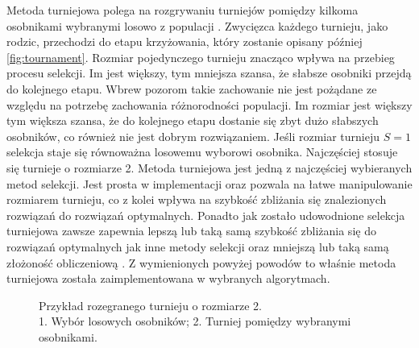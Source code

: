 \documentclass[twoside]{iisthesis}
\begin{document}
Metoda turniejowa polega na rozgrywaniu turniejów pomiędzy kilkoma osobnikami wybranymi losowo z populacji \cite{tournament}. Zwycięzca każdego turnieju, jako rodzic, przechodzi do etapu krzyżowania, który zostanie opisany później \eqref{fig:tournament}. Rozmiar pojedynczego turnieju znacząco wpływa na przebieg procesu selekcji. Im jest większy, tym mniejsza szansa, że słabsze osobniki przejdą do kolejnego etapu. Wbrew pozorom takie zachowanie nie jest pożądane ze względu na potrzebę zachowania różnorodności populacji. Im rozmiar jest większy tym większa szansa, że do kolejnego etapu dostanie się zbyt dużo słabszych osobników, co również nie jest dobrym rozwiązaniem. Jeśli rozmiar turnieju $S = 1$ selekcja staje się równoważna losowemu wyborowi osobnika. Najczęściej stosuje się turnieje o rozmiarze 2. Metoda turniejowa jest jedną z najczęściej wybieranych metod selekcji. Jest prosta w implementacji oraz pozwala na łatwe manipulowanie rozmiarem turnieju, co z kolei wpływa na szybkość zbliżania się znalezionych rozwiązań do rozwiązań optymalnych. Ponadto jak zostało udowodnione selekcja turniejowa zawsze zapewnia lepszą lub taką samą szybkość zbliżania się do rozwiązań optymalnych jak inne metody selekcji oraz mniejszą lub taką samą złożoność obliczeniową \cite{book}. Z wymienionych powyżej powodów to właśnie metoda turniejowa została zaimplementowana w wybranych algorytmach.
\begin{figure}[!htb]
	\centering
	\caption{Przykład rozegranego turnieju o rozmiarze 2.\\1. Wybór losowych osobników; 2. Turniej pomiędzy wybranymi osobnikami.}
	\label{fig:tournament}
\end{figure}
\end{document}
